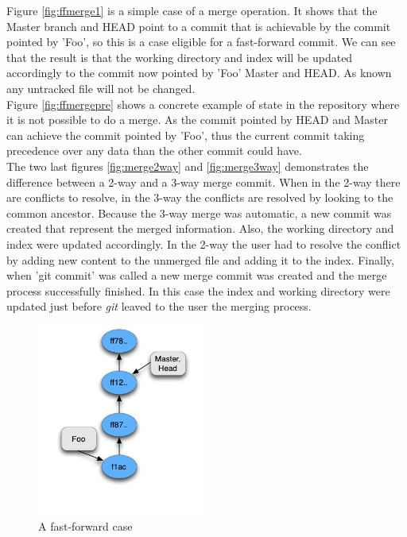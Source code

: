 Figure \ref{fig:ffmerge1} is a simple case of a merge operation. It shows
that the Master branch and HEAD point to a commit that is achievable by the
commit pointed by 'Foo', so this is a case eligible for a fast-forward commit.
We can see that the result is that the working directory and index will be
updated accordingly to the commit now pointed by 'Foo' Master and HEAD. As
known any untracked file will not be changed. \\

Figure \ref{fig:ffmergepre} shows a concrete example of state in the repository
where it is not possible to do a merge. As the commit pointed by HEAD and Master
can achieve the commit pointed by 'Foo', thus the current commit taking
precedence over any data than the other commit could have. \\

The two last figures \ref{fig:merge2way} and \ref{fig:merge3way} demonstrates 
the difference between a 2-way and a 3-way merge commit. When in the 2-way there
are conflicts to resolve, in the 3-way the conflicts are resolved by looking to
the common ancestor. Because the 3-way merge was automatic, a new commit was
created that represent the merged information. Also, the working directory and
index were updated accordingly. In the 2-way the user had to resolve the
conflict by adding new content to the unmerged file and adding it to the index.
Finally, when 'git commit' was called a new merge commit was created and 
the merge process successfully finished. In this case the index and working 
directory were updated just before \emph{git} leaved to the user the merging
process. \\

\begin{figure}[!t]
   \centering
   \includegraphics[width=0.5\textwidth]{images/fast_forward.png}
   \caption{A fast-forward case}\label{fig:fast_forward}
\end{figure}

